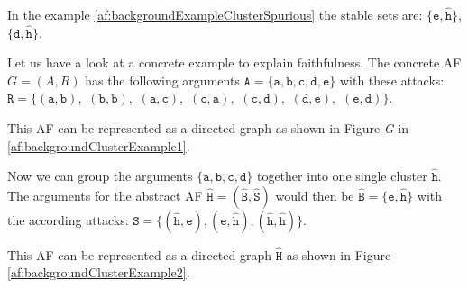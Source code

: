 In the example \ref{af:backgroundExampleClusterSpurious} the stable sets are:
$\mathtt{\{e, \hat{h}}\}$,
$\mathtt{\{d, \hat{h}}\}$.

\vspace{0.5cm}
\noindent
Let us have a look at a concrete example to explain faithfulness. The concrete AF $G = (A, R)$ has the following arguments $\mathtt{A=\{a, b, c, d, e\}}$ with these attacks:
$\mathtt{R=\{(a,b),}$
$\mathtt{(b,b),}$
$\mathtt{(a,c),}$
$\mathtt{(c,a),}$
$\mathtt{(c,d),}$
$\mathtt{(d,e),}$
$\mathtt{(e,d)\}}$.

This AF can be represented as a directed graph as shown in Figure \textit{G} in \ref{af:backgroundClusterExample1}.

Now we can group the arguments $\mathtt{\{a, b, c, d\}}$ together into one single cluster $\mathtt{\hat{h}}$. The arguments for the abstract AF $\mathtt{\hat{H} = (\hat{B}, \hat{S})}$ would then be $\mathtt{\hat{B}=\{e, \hat{h}\}}$ with the according attacks:
$\mathtt{\hat{S}=\{(\hat{h}, e), (e, \hat{h}), (\hat{h}, \hat{h})\}}$.

This AF can be represented as a directed graph $\mathtt{\hat{H}}$ as shown in Figure \ref{af:backgroundClusterExample2}.


